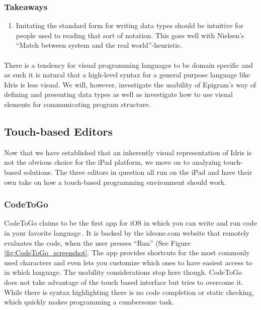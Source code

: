 \subsubsection{Takeaways}
\begin{enumerate}
	\item Imitating the standard form for writing data types should be intuitive for people used to reading that sort of notation. This goes well with Nielsen’s ``Match between system and the real world''-heuristic.
\end{enumerate}

\paragraph{}

There is a tendency for visual programming languages to be domain specific and
as such it is natural that a high-level syntax for a general purpose language
like Idris is less visual. We will, however, investigate the usability of Epigram's way of
defining and presenting data types as well as investigate how to use visual
elements for communicating program structure.



\subsection{Touch-based Editors}
\label{subsec:TouchBasedEditors}
Now that we have established that an inherently visual representation of Idris is not the obvious choice for the iPad platform, we move on to analyzing touch-based solutions. The three editors in question all run on the iPad and have their own take on how a touch-based programming environment should work.

\subsubsection{CodeToGo}
\label{subsub:CodeToGo}
CodeToGo claims to be the first app for iOS in which you can write and run code in your favorite language\,\cite{codetogo}. It is backed by the ideone.com website\cite{ideone} that remotely evaluates the code, when the user presses ``Run'' (See Figure \ref{fig:CodeToGo_screenshot}. The app provides shortcuts for the most commonly used characters and even lets you customize which ones to have easiest access to in which language. The usability considerations stop here though. CodeToGo does not take advantage of the touch based interface but tries to overcome it. While there is syntax highlighting there is no code completion or static checking, which quickly makes programming a cumbersome task.

